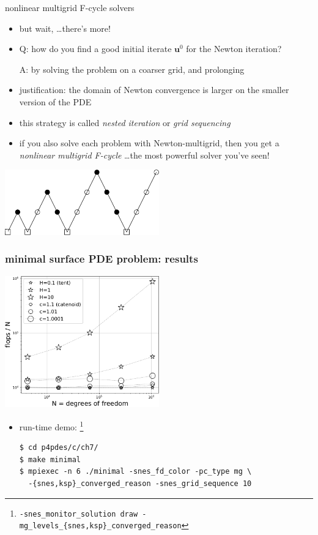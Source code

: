\documentclass[10pt,
               svgnames,
               hyperref={colorlinks,citecolor=DeepPink4,linkcolor=FireBrick,urlcolor=Maroon},
               usepdftitle=false]{beamer}
\newcommand{\bu}{\mathbf{u}}
\newcommand\blfootnote[1]{%
  \begingroup
  \renewcommand\thefootnote{}\footnote{#1}%
  \addtocounter{footnote}{-1}%
  \endgroup
}
\begin{document}
\begin{frame}{nonlinear multigrid F-cycle solvers}
\begin{itemize}
\item but wait, \dots there's more!

\medskip
\item Q: how do you find a good initial iterate $\bu^0$ for the Newton iteration?

\medskip
A: by solving the problem on a coarser grid, and prolonging

\medskip
\item<2-3> justification: the domain of Newton convergence is larger on the smaller version of the PDE

\medskip
\item<3> this strategy is called \emph{nested iteration} or \emph{grid sequencing}
\item<3> if you also solve each problem with Newton-multigrid, then you get a \emph{nonlinear multigrid F-cycle} \dots the most powerful solver you've seen!
\end{itemize}

\medskip
\begin{center}
\includegraphics[width=0.5\textwidth]{images/multigrid-fullcycle.png}
\end{center}
\end{frame}


\begin{frame}[fragile]
\frametitle{minimal surface PDE problem: results}

\begin{center}
\includegraphics[width=0.5\textwidth]{images/minimal-flopsperdof.png}
\end{center}

\begin{itemize}
\item<2> run-time demo:\blfootnote{{\tiny \texttt{-snes\_monitor\_solution draw -mg\_levels\_\{snes,ksp\}\_converged\_reason}}}

\begin{Verbatim}
$ cd p4pdes/c/ch7/
$ make minimal
$ mpiexec -n 6 ./minimal -snes_fd_color -pc_type mg \
  -{snes,ksp}_converged_reason -snes_grid_sequence 10
\end{Verbatim}
\bigskip
\end{itemize}
\end{frame}
\end{document}
